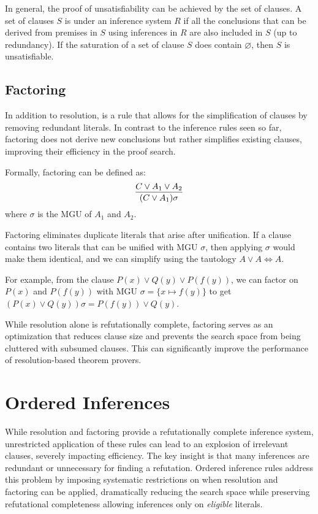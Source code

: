 In general, the proof of unsatisfiability can be achieved by  the set of clauses. A set of clauses \(S\) is  under an inference system \(R\) if all the conclusions that can be derived from premises in \(S\) using inferences in \(R\) are also included in \(S\) (up to redundancy).
If the saturation of a set of clause \(S\) does contain \(\varnothing\), then \(S\) is unsatisfiable.

\subsection{Factoring}\label{subsec:factoring}

In addition to resolution,  is a rule that allows for the simplification of clauses by removing redundant literals.
In contrast to the inference rules seen so far, factoring does not derive new conclusions but rather simplifies existing clauses, improving their efficiency in the proof search.

Formally, factoring can be defined as:
\begin{equation}
  \infer{(C \lor A_1)\sigma}{C \lor A_1 \lor A_2}
\end{equation}
\indent where \(\sigma\) is the MGU of \(A_1\) and \(A_2\).

\noindent Factoring eliminates duplicate literals that arise after unification. If a clause contains two literals that can be unified with MGU \(\sigma\), then applying \(\sigma\) would make them identical, and we can simplify using the tautology \(A \lor A \iff A\).

For example, from the clause \(P(x) \lor Q(y) \lor P(f(y))\), we can factor on \(P(x)\) and \(P(f(y))\) with MGU \(\sigma = \{x \mapsto f(y)\}\) to get \((P(x) \lor Q(y))\sigma = P(f(y)) \lor Q(y)\).

While resolution alone is refutationally complete, factoring serves as an optimization that reduces clause size and prevents the search space from being cluttered with subsumed clauses. This can significantly improve the performance of resolution-based theorem provers.

\section{Ordered Inferences}\label{sec:ordered-inferences}

While resolution and factoring provide a refutationally complete inference system, unrestricted application of these rules can lead to an explosion of irrelevant clauses, severely impacting efficiency. The key insight is that many inferences are redundant or unnecessary for finding a refutation.
Ordered inference rules address this problem by imposing systematic restrictions on when resolution and factoring can be applied, dramatically reducing the search space while preserving refutational completeness allowing inferences only on \emph{eligible} literals.

